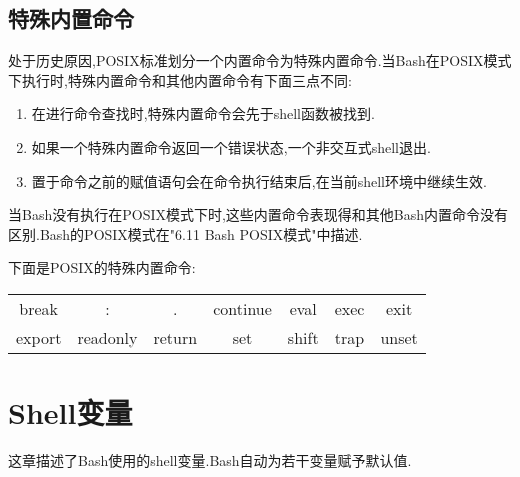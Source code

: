 \documentclass[draft,openany]{book}
\begin{document}
\begin{CJK}{UTF8}{gbsn}
    \section{特殊内置命令}
    处于历史原因,POSIX标准划分一个内置命令为特殊内置命令.当Bash在POSIX模式下执行时,特殊内置命令和其他内置命令有下面三点不同:
    \begin{enumerate}
        \item 在进行命令查找时,特殊内置命令会先于shell函数被找到.
        \item 如果一个特殊内置命令返回一个错误状态,一个非交互式shell退出.
        \item 置于命令之前的赋值语句会在命令执行结束后,在当前shell环境中继续生效.
    \end{enumerate}
    \par
    当Bash没有执行在POSIX模式下时,这些内置命令表现得和其他Bash内置命令没有区别.Bash的POSIX模式在"6.11 Bash POSIX模式"中描述.\par
    下面是POSIX的特殊内置命令:\par
    \begin{tabular}{c c c c c c c}
        break & : & . & continue & eval & exec & exit \\
        export & readonly & return & set & shift & trap & unset
    \end{tabular}

    \chapter{Shell变量}
    这章描述了Bash使用的shell变量.Bash自动为若干变量赋予默认值.
    

\end{CJK}
\end{document}

